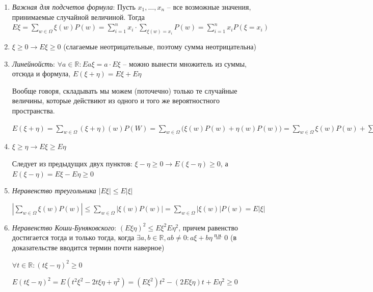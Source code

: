 \begin{enumerate}
    \item \textit{Важная для подсчетов формула}: Пусть $x_1, \dots, x_n$ -- все возможные значения, принимаемые случайной величиной. Тогда $E\xi = \sum\limits_{w \in \Omega}\xi(w)P(w) = \sum\limits_{i=1}^nx_i \cdot \sum\limits_{\xi(w) = x_i}P(w) = \sum\limits_{i=1}^nx_iP(\xi = x_i)$
    
    \item $\xi \geq 0 \rightarrow E \xi \geq 0$ (слагаемые неотрицательные, поэтому сумма неотрицательна)
    \item \textit{Линейнойсть}: $\forall a \in \mathbb{R} : Ea\xi = a \cdot E \xi$ -- можно вынести множитель из суммы, отсюда и формула,
    $E(\xi + \eta) = E \xi + E \eta$
    
    Вообще говоря, складывать мы можем (поточечно) только те случайные величины, которые действиют из одного и того же вероятностного пространства.
    
    \Proof
    $E(\xi + \eta) = \sum\limits_{w \in \Omega}(\xi + \eta)(w)P(W) = \sum\limits_{w \in \Omega}\Big(\xi(w)P(w) + \eta(w)P(w)\Big) = \sum\limits_{w \in \Omega}\xi(w)P(w) + \sum\limits_{w \in \Omega}\eta(w)P(w) = E\xi + E\eta$
    \EndProof
    
    \item $\xi \geq \eta \rightarrow E\xi \geq E\eta$
    
    \Proof
    Следует из предыдущих двух пунктов: $\xi - \eta \geq 0 \rightarrow E(\xi - \eta) \geq 0$, а $E(\xi - \eta) = E\xi - E\eta \geq 0$
    \EndProof
    
    \item \textit{Неравенство треугольника} $|E\xi| \leq E|\xi|$
    
    \Proof
    $|\sum\limits_{w \in \Omega} \xi(w)P(w)| \leq \sum\limits_{w \in \Omega} |\xi(w)P(w)| = \sum\limits_{w \in \Omega} |\xi(w)|P(w) = E|\xi|$
    \EndProof
    
    \item \textit{Неравенство Коши-Буняковского}: $(E\xi\eta)^2 \leq E\xi^2E\eta^2$, причем равенство достигается тогда и только тогда, когда $\exists a, b \in \mathbb{R}, ab \neq 0 : a\xi + b\eta \stackrel{\mbox{п.н.}}{=} 0$ (в доказательстве вводится термин почти наверное)
    
    \Proof
    $\forall t \in \mathbb{R} : (t\xi - \eta)^2 \geq 0$
    
    $E(t\xi - \eta)^2 = E(t^2\xi^2 - 2t\xi\eta + \eta^2) = (E\xi^2)t^2 - (2E\xi\eta)t + E\eta^2 \geq 0$
    

\end{enumerate}

